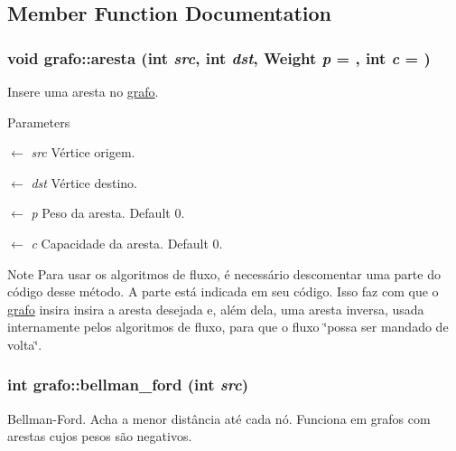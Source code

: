 \subsection{Member Function Documentation}
\hypertarget{structgrafo_ab6ebe34207a6e548bd74c80e1844f630}{
\subsubsection[{aresta}]{\setlength{\rightskip}{0pt plus 5cm}void grafo::aresta (int {\em src}, \/  int {\em dst}, \/  {\bf Weight} {\em p} = {}, \/  int {\em c} = {})}}
\label{structgrafo_ab6ebe34207a6e548bd74c80e1844f630}


Insere uma aresta no \hyperlink{structgrafo}{grafo}. 
\begin{DoxyParams}{Parameters}
\item[\mbox{$\leftarrow$} {\em src}]Vértice origem. \item[\mbox{$\leftarrow$} {\em dst}]Vértice destino. \item[\mbox{$\leftarrow$} {\em p}]Peso da aresta. Default 0. \item[\mbox{$\leftarrow$} {\em c}]Capacidade da aresta. Default 0.\end{DoxyParams}
\begin{DoxyNote}{Note}
Para usar os algoritmos de fluxo, é necessário descomentar uma parte do código desse método. A parte está indicada em seu código. Isso faz com que o \hyperlink{structgrafo}{grafo} insira insira a aresta desejada e, além dela, uma aresta inversa, usada internamente pelos algoritmos de fluxo, para que o fluxo \char`\"{}possa ser mandado de volta\char`\"{}. 
\end{DoxyNote}
\hypertarget{structgrafo_a0f981ed5e3298233a8e573fa44ddf87e}{
\subsubsection[{bellman\_\-ford}]{\setlength{\rightskip}{0pt plus 5cm}int grafo::bellman\_\-ford (int {\em src})}}
\label{structgrafo_a0f981ed5e3298233a8e573fa44ddf87e}


Bellman-\/Ford. Acha a menor distância até cada nó. Funciona em grafos com arestas cujos pesos são negativos.


